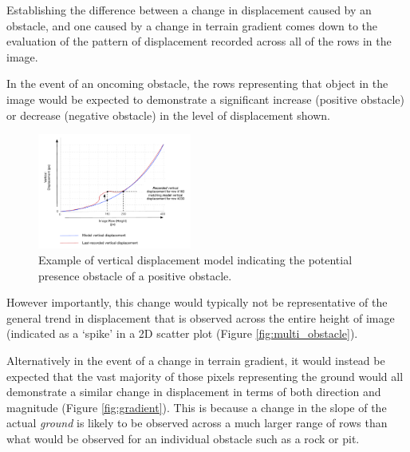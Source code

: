   
 Establishing the difference between a change in displacement caused by an obstacle, and one caused by a change in terrain gradient comes down to the evaluation of the pattern of displacement recorded across all of the rows in the image.
 
 In the event of an oncoming obstacle, the rows representing that object in the image would be expected to demonstrate a significant increase (positive obstacle) or decrease (negative obstacle) in the level of displacement shown. 

\clearpage
\begin{figure}
\vspace{-20pt}
  \begin{center}
    \includegraphics[width=0.45\textwidth]{images/obstacle_graph.pdf}
  \end{center}
  \vspace{-10pt}
  \caption{Example of vertical displacement model indicating the potential presence obstacle of a positive obstacle.}
  \label{fig:obstacle}
  \vspace{21pt}
\end{figure}

However importantly, this change would typically not be representative of the general trend in displacement that is observed across the entire height of image (indicated as a `spike' in a 2D scatter plot (Figure \ref{fig:multi_obstacle}). 

 Alternatively in the event of a change in terrain gradient, it would instead be expected that the vast majority of those pixels representing the ground would all demonstrate a similar change in displacement in terms of both direction and magnitude (Figure \ref{fig:gradient}). This is because a change in the slope of the actual \textit{ground} is likely to be observed across a much larger range of rows than what would be observed for an individual obstacle such as a rock or pit.

